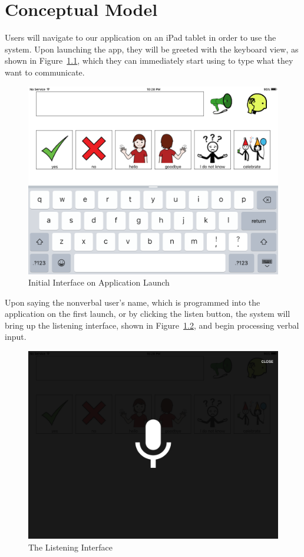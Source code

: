 \chapter{Conceptual Model}

Users will navigate to our application on an iPad tablet in order to use the system. Upon launching the app, they will be greeted with the keyboard view, as shown in Figure~\ref{fig:ui}, which they can immediately start using to type what they want to communicate.

\begin{figure}[htb]
\centering
\includegraphics[width=\textwidth]{initialInterface.png}
\caption{Initial Interface on Application Launch}
\label{fig:ui}
\end{figure}

Upon saying the nonverbal user's name, which is programmed into the application on the first launch, or by clicking the listen button, the system will bring up the listening interface, shown in Figure~\ref{fig:listening}, and begin processing verbal input.

\begin{figure}[htb]
\centering
\includegraphics[width=\textwidth]{listeningInterface.png}
\caption{The Listening Interface}
\label{fig:listening}
\end{figure}

